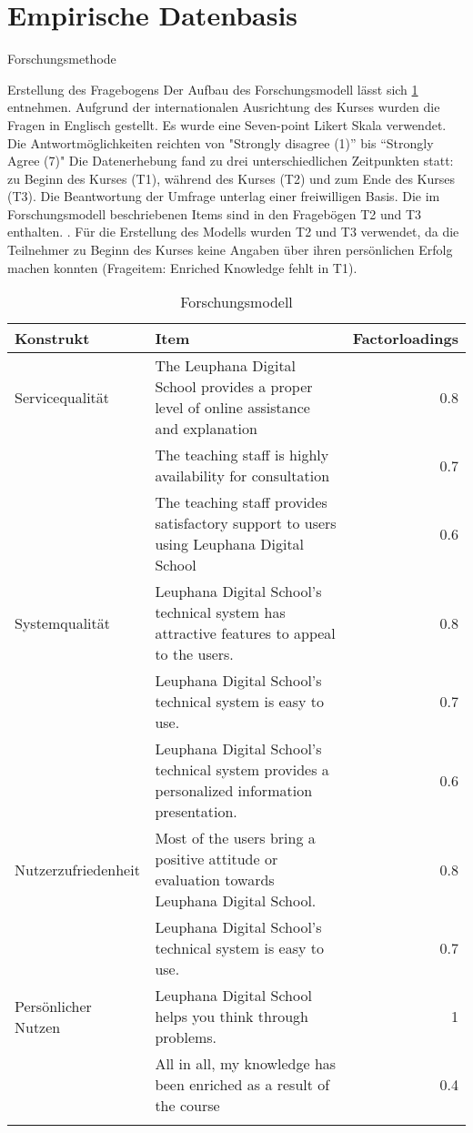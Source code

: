 \section{Empirische Datenbasis}
\label{sec:emp_daten}

Forschungsmethode

Erstellung des Fragebogens
Der Aufbau des Forschungsmodell lässt sich \ref{tab:Forschungsmodell} entnehmen. Aufgrund der internationalen Ausrichtung des Kurses wurden die Fragen in Englisch gestellt. 
Es wurde eine Seven-point Likert Skala verwendet. Die Antwortmöglichkeiten reichten von "Strongly disagree (1)” bis “Strongly Agree (7)"  
Die Datenerhebung fand zu drei unterschiedlichen Zeitpunkten statt: zu Beginn des Kurses (T1), während des Kurses (T2) und zum Ende des Kurses (T3). Die Beantwortung der Umfrage unterlag einer freiwilligen Basis. Die im Forschungsmodell beschriebenen Items sind in den Fragebögen T2 und T3 enthalten. .
Für die Erstellung des Modells wurden T2 und T3 verwendet, da die Teilnehmer zu Beginn des Kurses keine Angaben über ihren persönlichen Erfolg machen konnten (Frageitem: Enriched Knowledge fehlt in T1). 
 

\begin{table}[ht] 
\footnotesize
\caption{Forschungsmodell}
\label{tab:Forschungsmodell} 
\begin{tabular}{@{}lp{10cm}r@{}} \toprule

\textbf{Konstrukt} & \textbf{Item} & \textbf{Factorloadings} \\ \midrule

Servicequalität & The Leuphana Digital School provides a proper level of online assistance and explanation & 0.8\\ 
& The teaching staff is highly availability for consultation & 0.7 \\
& The teaching staff provides satisfactory support to users using Leuphana Digital School & 0.6 \\ 
Systemqualität & Leuphana Digital School’s technical system has attractive features to appeal to the users. & 0.8\\ 
& Leuphana Digital School’s technical system is easy to use. & 0.7 \\
& Leuphana Digital School’s technical system provides a personalized information presentation. & 0.6 \\ 
Nutzerzufriedenheit & Most of the users bring a positive attitude or evaluation towards Leuphana Digital School. & 0.8\\ 
& Leuphana Digital School’s technical system is easy to use. & 0.7 \\ 
Persönlicher Nutzen & Leuphana Digital School helps you think through problems.  & 1\\ 
& All in all, my knowledge has been enriched as a result of the course & 0.4 \\ \addlinespace 
  \bottomrule

\end{tabular}	
\end{table}


